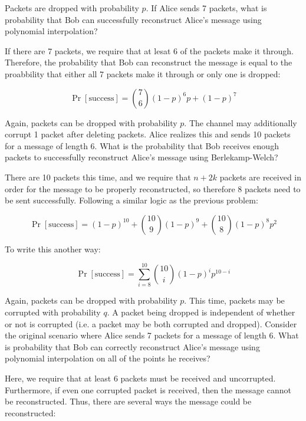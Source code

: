\documentclass[11pt]{article}
\begin{document}
\begin{Parts}
\Part Packets are dropped with probability $p$. If Alice sends 7 packets, what is probability that Bob can successfully reconstruct Alice's message using polynomial interpolation?

\begin{solution}
	If there are 7 packets, we require that at lesat 6 of the packets make it through. Therefore, the probability that Bob can reconstruct the message is equal to the proabbility that either all 7 packets make it through or only one is dropped: 

	\[ \Pr[\text{success}] = {7 \choose 6}(1-p)^6 p + (1-p)^7\]
\end{solution}

\Part Again, packets can be dropped with probability $p$. The channel may additionally corrupt 1 packet after deleting packets.
Alice realizes this and sends 10 packets for a message of length 6. What is the probability that Bob receives enough packets to successfully reconstruct Alice's message using Berlekamp-Welch?

\begin{solution}
	There are 10 packets this time, and we require that $n + 2k$ packets are received in order for the message to be properly reconstructed, so therefore 8 packets need to be sent successfully. Following a similar logic as the previous problem:

	\[ \Pr[\text{success}] = (1-p)^{10} + {10 \choose 9} (1-p)^9  + {10 \choose 8}(1-p)^8 p^2 \]

	To write this another way: 
	
	\[ \Pr[\text{success}] = \sum_{i = 8}^{10} {10 \choose i}(1-p)^i p^{10 - i}\]
\end{solution}

\Part Again, packets can be dropped with probability $p$. This time, packets may be corrupted with probability $q$.
A packet being dropped is independent of whether or not is corrupted (i.e. a packet may be both corrupted and dropped). Consider the original scenario where Alice sends 7 packets for a message of length 6.
What is probability that Bob can correctly reconstruct Alice's message using polynomial interpolation on all of the points he receives?

\begin{solution}
	Here, we require that at least 6 packets must be received and uncorrupted. Furthermore, if even one corrupted packet is received, then the message cannot be reconstructed.  Thus, there are several ways the message could be reconstructed:


\end{solution}
\end{Parts}
\end{document}
